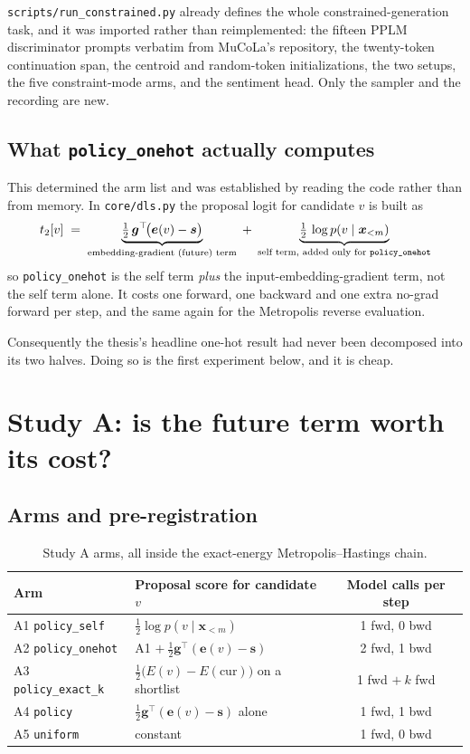 \documentclass[11pt,a4paper]{article}
\newcommand{\ve}{\bm{e}}
\newcommand{\vs}{\bm{s}}
\newcommand{\vx}{\bm{x}}
\newcommand{\vg}{\bm{g}}
\newcommand{\file}[1]{\texttt{\small #1}}
\begin{document}
\file{scripts/run\_constrained.py} already defines the whole constrained-generation
task, and it was imported rather than reimplemented: the fifteen PPLM discriminator
prompts verbatim from MuCoLa's repository, the twenty-token continuation span, the
centroid and random-token initializations, the two setups, the five constraint-mode
arms, and the sentiment head. Only the sampler and the recording are new.

\subsection{What \texttt{policy\_onehot} actually computes}

This determined the arm list and was established by reading the code rather than from
memory. In \file{core/dls.py} the proposal logit for candidate $v$ is built as
\[
  t_2[v] \;=\; \underbrace{\tfrac{1}{2}\,\vg^\top\!\big(\ve(v) - \vs\big)}_{\text{embedding-gradient (future) term}}
  \;+\; \underbrace{\tfrac{1}{2}\,\log p(v \mid \vx_{<m})}_{\text{self term, added only for \texttt{policy\_onehot}}}
\]
so \texttt{policy\_onehot} is the self term \emph{plus} the input-embedding-gradient
term, not the self term alone. It costs one forward, one backward and one extra no-grad
forward per step, and the same again for the Metropolis reverse evaluation.

Consequently the thesis's headline one-hot result had never been decomposed into its two
halves. Doing so is the first experiment below, and it is cheap.

\section{Study A: is the future term worth its cost?}

\subsection{Arms and pre-registration}

\begin{table}[htbp]
\centering
\begin{tabular}{llc}
\toprule
Arm & Proposal score for candidate $v$ & Model calls per step \\
\midrule
A1 \texttt{policy\_self}    & $\tfrac12 \log p(v \mid \vx_{<m})$ & 1 fwd, 0 bwd \\
A2 \texttt{policy\_onehot}  & A1 $+\ \tfrac12 \vg^\top(\ve(v)-\vs)$ & 2 fwd, 1 bwd \\
A3 \texttt{policy\_exact\_k}& $\tfrac12\big(E(v) - E(\text{cur})\big)$ on a shortlist & 1 fwd $+\ k$ fwd \\
A4 \texttt{policy}          & $\tfrac12 \vg^\top(\ve(v)-\vs)$ alone & 1 fwd, 1 bwd \\
A5 \texttt{uniform}         & constant & 1 fwd, 0 bwd \\
\bottomrule
\end{tabular}
\caption{Study A arms, all inside the exact-energy Metropolis--Hastings chain.}
\end{table}
\end{document}
